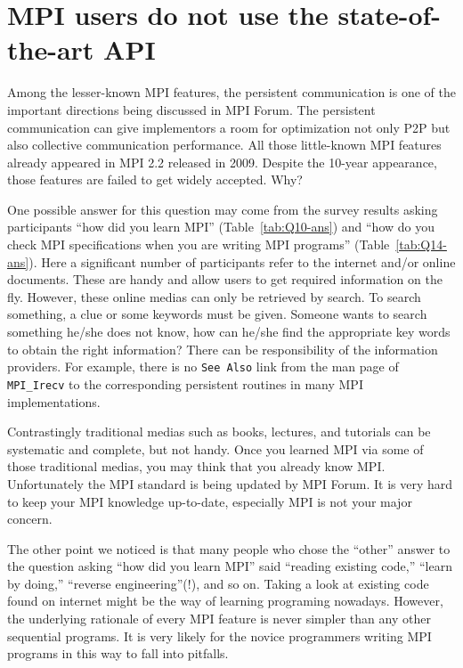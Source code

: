 \documentclass[sigconf,nonacm]{acmart}
\begin{document}
\section{MPI users do not use the state-of-the-art API}

Among the lesser-known MPI features, the persistent communication is
one of the important directions being discussed in MPI Forum\cite{mpi-forum}.
The persistent communication can give implementors a room for
optimization not only P2P but also collective communication
performance.
All those little-known MPI features already appeared in MPI 2.2
released in 2009. Despite the 10-year appearance, those features
are failed to get widely accepted.  Why?

One possible answer for this question may come from the survey results
asking participants ``how did you learn MPI''
(Table~\ref{tab:Q10-ans}) and ``how do you check
MPI specifications when you are writing MPI programs''
(Table~\ref{tab:Q14-ans}).
Here a significant number of participants refer to the internet
and/or online documents. These are handy and allow users to get
required information on the fly. However,
these online medias can only be retrieved by
search. To search something, a clue or some keywords must be given.
Someone wants to search something he/she does not know, how can he/she
find the appropriate key words to obtain the right information?
There can be responsibility of the information providers. For example,
there is no {\tt See Also} link from the man page of {\tt MPI\_Irecv}
to the corresponding persistent routines in many MPI implementations.

Contrastingly traditional medias such as books, lectures, and tutorials can be
systematic and complete, but not handy.  Once you learned MPI via some
of those traditional medias, you may think that you already know
MPI. Unfortunately the MPI standard is being updated by MPI Forum. It is
very hard to keep your MPI knowledge up-to-date, especially MPI is not
your major concern.

The other point we noticed is that many people who chose the ``other''
answer to the question asking ``how did you learn MPI'' said
``reading existing code,'' ``learn by doing,'' ``reverse
engineering''(!),  and so on. Taking a look at existing code found on
internet might be the way of learning programing nowadays. However,
the underlying rationale of every MPI feature is never simpler than
any other sequential programs. It is very likely for the novice
programmers writing MPI programs in this way to fall into pitfalls.
\end{document}

